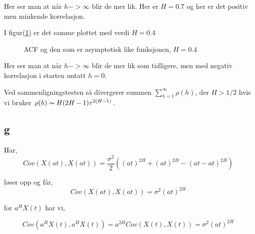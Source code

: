 \documentclass[10pt]{article}
\begin{document}
{Her ser man at når $h -> \infty$ blir de mer lik. Her er $H = 0.7$ og her er det positiv men minkende korrelasjon.

I figur(\ref{asymp2}) er det samme plottet med verdi $H = 0.4$

\begin{figure}[hbt!]
\caption{ACF og den som er asymptotisk like funksjonen, $H = 0.4$}
\label{asymp2}
\end{figure}

Her ser man at når $h -> \infty$ blir de mer lik som tidligere, men med negativ korrelasjon i starten untatt $h = 0$.

Ved sammenligningstesten så divergerer summen $\sum_{h = 1}^{\infty} \rho(h)$, der $H > 1/2$ hvis vi bruker $\rho(h) \thicksim H(2H-1)\tau^{2(H-1)}$.

\subsection{g}
Har,
\begin{equation}
Cov(X(at),X(at)) = \frac{\sigma^2}{2}((at)^{2H} + (at)^{2H} - ( at - at)^{2H})
\end{equation}

løser opp og får,
\begin{equation}
  Cov(X(at),X(at)) = \sigma^2(at)^{2H}
  \end{equation}

for $a^{H}X(t)$ har vi,

\begin{equation}
  Cov(a^{H}X(t),a^{H}X(t)) = a^{2H}Cov(X(t), X(t)) = \sigma^2(at)^{2H}
  \end{equation}

}
\end{document}
